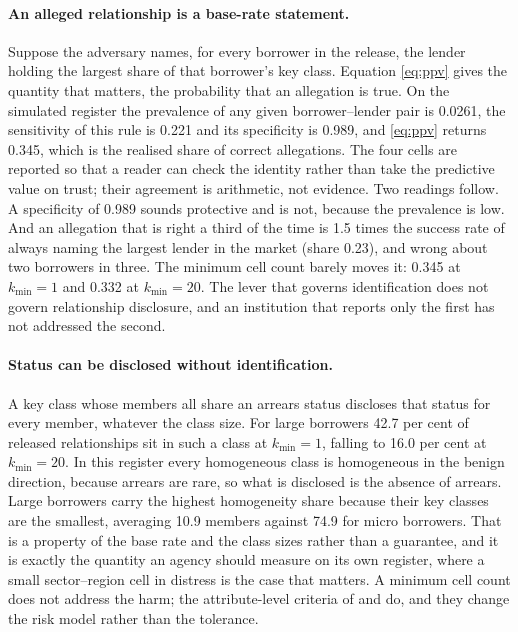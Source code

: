 \documentclass[11pt,a4paper]{article}
\theoremstyle{plain}
\theoremstyle{definition}
\begin{document}
\paragraph{An alleged relationship is a base-rate statement.} Suppose the adversary names, for every borrower in the release, the lender holding
the largest share of that borrower's key class. Equation \eqref{eq:ppv} gives the
quantity that matters, the probability that an allegation is true. On the
simulated register the prevalence of any given borrower--lender pair is 0.0261,
the sensitivity of this rule is 0.221 and its specificity is 0.989, and \eqref{eq:ppv} returns 0.345, which is the realised share of correct
allegations. The four cells are reported so that a reader can check the identity
rather than take the predictive value on trust; their agreement is arithmetic, not
evidence. Two readings follow. A specificity of 0.989
sounds protective and is not, because the prevalence is low. And an
allegation that is right a third of the time is 1.5 times the success rate of
always naming the largest lender in the market (share 0.23), and wrong about two
borrowers in three. The minimum cell count barely moves it: 0.345
at $k_{\min} = 1$ and 0.332 at $k_{\min} = 20$. The lever that governs
identification does not govern relationship disclosure, and an institution that
reports only the first has not addressed the second.

\paragraph{Status can be disclosed without identification.} A key class whose
members all share an arrears status discloses that status for every member,
whatever the class size. For large borrowers 42.7 per cent of released
relationships sit in such a class at $k_{\min} = 1$, falling to 16.0 per cent at
$k_{\min} = 20$. In this register every homogeneous class is homogeneous in the benign direction,
because arrears are rare, so what is disclosed is the absence of arrears. Large
borrowers carry the highest homogeneity share because their key classes are the
smallest, averaging 10.9 members against 74.9 for micro borrowers. That is a property of the base rate and the
class sizes rather than a guarantee, and it is exactly the quantity an agency
should measure on its own register, where a small sector--region cell in distress
is the case that matters. A minimum cell count does not address the harm; the
attribute-level criteria of \citet{machanavajjhala2007} and \citet{li2007} do,
and they change the risk model rather than the tolerance.
\end{document}
